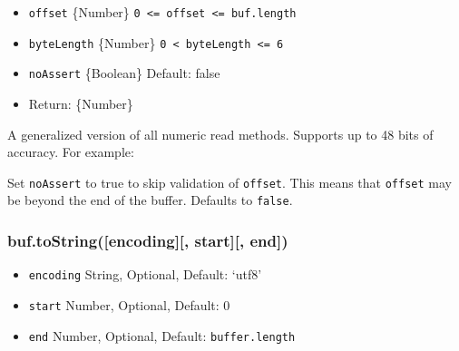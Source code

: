 \begin{itemize}
\itemsep1pt\parskip0pt
\item
  \texttt{offset} \{Number\}
  \texttt{0\ \textless{}=\ offset\ \textless{}=\ buf.length}
\item
  \texttt{byteLength} \{Number\}
  \texttt{0\ \textless{}\ byteLength\ \textless{}=\ 6}
\item
  \texttt{noAssert} \{Boolean\} Default: false
\item
  Return: \{Number\}
\end{itemize}

A generalized version of all numeric read methods. Supports up to 48
bits of accuracy. For example:

\begin{Shaded}
\begin{Highlighting}[]
  \NormalTok{(}\NormalTok{);}
\NormalTok{(}\NormalTok{, }\NormalTok{);}
\NormalTok{(}\NormalTok{, }\NormalTok{);}
\NormalTok{(}\NormalTok{, }\NormalTok{(}\NormalTok{);  }
\end{Highlighting}
\end{Shaded}

Set \texttt{noAssert} to true to skip validation of \texttt{offset}.
This means that \texttt{offset} may be beyond the end of the buffer.
Defaults to \texttt{false}.

\subsubsection{buf.toString({[}encoding{]}{[}, start{]}{[},
end{]})}\label{buf.tostringencoding-start-end}

\begin{itemize}
\itemsep1pt\parskip0pt
\item
  \texttt{encoding} String, Optional, Default: `utf8'
\item
  \texttt{start} Number, Optional, Default: 0
\item
  \texttt{end} Number, Optional, Default: \texttt{buffer.length}
\end{itemize}

